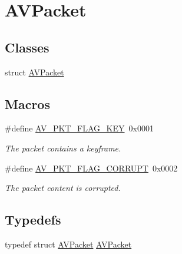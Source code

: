 \hypertarget{group__lavc__packet}{}\section{A\+V\+Packet}
\label{group__lavc__packet}
\subsection*{Classes}
\begin{DoxyCompactItemize}
\item 
struct \hyperlink{struct_a_v_packet}{A\+V\+Packet}
\end{DoxyCompactItemize}
\subsection*{Macros}
\begin{DoxyCompactItemize}
\item 
\#define \hyperlink{group__lavc__packet_ga75603d7c2b8adf5829f4fd2fb860168f}{A\+V\+\_\+\+P\+K\+T\+\_\+\+F\+L\+A\+G\+\_\+\+K\+EY}~0x0001
\begin{DoxyCompactList}\small\item\em The packet contains a keyframe. \end{DoxyCompactList}\item 
\#define \hyperlink{group__lavc__packet_ga46187df0d7711108ece88804dcc38025}{A\+V\+\_\+\+P\+K\+T\+\_\+\+F\+L\+A\+G\+\_\+\+C\+O\+R\+R\+U\+PT}~0x0002
\begin{DoxyCompactList}\small\item\em The packet content is corrupted. \end{DoxyCompactList}\end{DoxyCompactItemize}
\subsection*{Typedefs}
\begin{DoxyCompactItemize}
\item 
typedef struct \hyperlink{struct_a_v_packet}{A\+V\+Packet} \hyperlink{group__lavc__packet_ga0d1607e2c2c502bcd41713233553e7b8}{A\+V\+Packet}
\end{DoxyCompactItemize}
